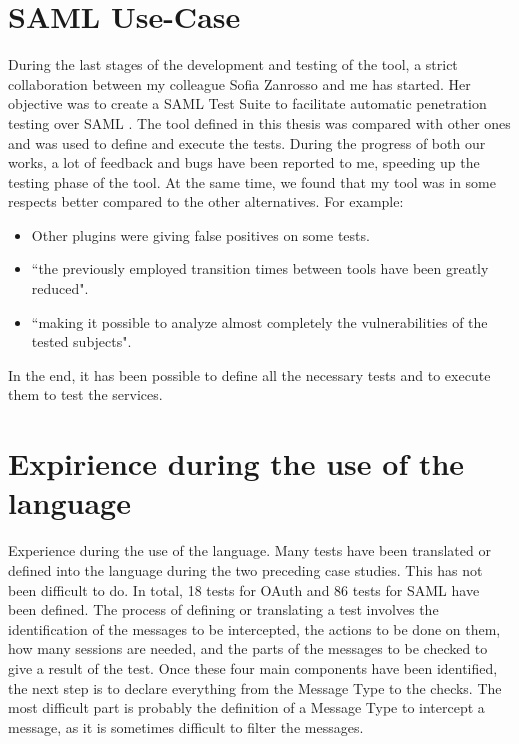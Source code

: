 \section{SAML Use-Case}
During the last stages of the development and testing of the tool, a strict collaboration between my colleague Sofia Zanrosso and me has started. Her objective was to create a \gls{SAML} Test Suite to facilitate automatic penetration testing over \gls{SAML} \cite{sofia_zanrosso}. The tool defined in this thesis was compared with other ones and was used to define and execute the tests. During the progress of both our works, a lot of feedback and bugs have been reported to me, speeding up the testing phase of the tool. At the same time, we found that my tool was in some respects better compared to the other alternatives. For example:
\begin{itemize}
    \item Other plugins were giving false positives on some tests.
    \item ``the previously employed transition times between tools have been greatly reduced".
    \item ``making it possible to analyze almost completely the vulnerabilities of the tested subjects".
\end{itemize}
In the end, it has been possible to define all the necessary tests and to execute them to test the services.

\section{Expirience during the use of the language}
Experience during the use of the language.
Many tests have been translated or defined into the language during the two preceding case studies. This has not been difficult to do. In total, 18 tests for OAuth and 86 tests for SAML have been defined. The process of defining or translating a test involves the identification of the messages to be intercepted, the actions to be done on them, how many sessions are needed, and the parts of the messages to be checked to give a result of the test. Once these four main components have been identified, the next step is to declare everything from the Message Type to the checks. The most difficult part is probably the definition of a Message Type to intercept a message, as it is sometimes difficult to filter the messages.






